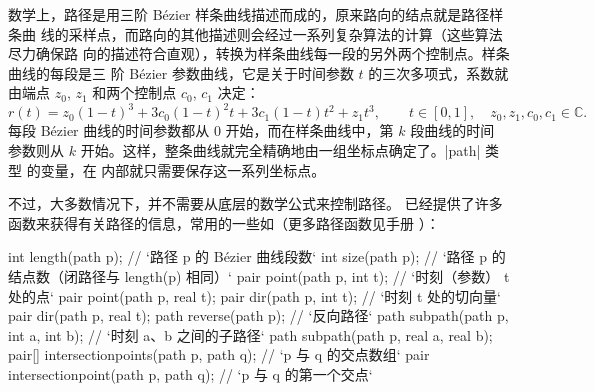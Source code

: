数学上，路径是用三阶 Bézier 样条曲线描述而成的，原来路向的结点就是路径样条曲
线的采样点，而路向的其他描述则会经过一系列复杂算法的计算（这些算法尽力确保路
向的描述符合直观），转换为样条曲线每一段的另外两个控制点。样条曲线的每段是三
阶 Bézier 参数曲线，它是关于时间参数 $t$ 的三次多项式，系数就由端点 $z_0$,
$z_1$ 和两个控制点 $c_0$, $c_1$ 决定：
\[
  r(t) = z_0 (1-t)^3 + 3 c_0 (1-t)^2 t + 3 c_1 (1-t) t^2 + z_1 t^3,
  \qquad t \in [0,1], \quad z_0, z_1, c_0, c_1 \in \mathbb{C}.
\]
每段 Bézier 曲线的时间参数都从 $0$ 开始，而在样条曲线中，第 $k$ 段曲线的时间
参数则从 $k$ 开始。这样，整条曲线就完全精确地由一组坐标点确定了。|path| 类型
的变量，在 \Asy{} 内部就只需要保存这一系列坐标点。

不过，大多数情况下，并不需要从底层的数学公式来控制路径。\Asy{} 已经提供了许多
函数来获得有关路径的信息，常用的一些如（更多路径函数见手册 \cite{asyman}）：
\begin{asycode}
int length(path p);         // `\color{comment}路径 p 的 Bézier 曲线段数`
int size(path p);           // `\color{comment}路径 p 的结点数（闭路径与 length(p) 相同）`
pair point(path p, int t);  // `\color{comment}时刻（参数） t 处的点`
pair point(path p, real t);
pair dir(path p, int t);    // `\color{comment}时刻 t 处的切向量`
pair dir(path p, real t);
path reverse(path p);       // `\color{comment}反向路径`
path subpath(path p, int a, int b);     // `\color{comment}时刻 a、b 之间的子路径`
path subpath(path p, real a, real b);
pair[] intersectionpoints(path p, path q);  // `\color{comment}p 与 q 的交点数组`
pair intersectionpoint(path p, path q);     // `\color{comment}p 与 q 的第一个交点`
\end{asycode}

